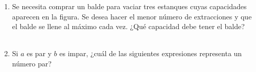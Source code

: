 \documentclass[11pt,letterpaper]{article}
\newcommand{\figureplaceholder}[2][4.2cm]{%
\begin{center}
\fbox{%
\begin{minipage}[c][#1][c]{0.88\linewidth}
\centering \textbf{Espacio reservado para figura}\\[3pt]
#2
\end{minipage}}
\end{center}}
\newenvironment{alternativas}{%
\begin{enumerate}[label=\Alph*), leftmargin=14pt, itemsep=2pt, topsep=2pt]
}{\end{enumerate}}
\begin{document}
\begin{enumerate}[label=\textbf{\arabic*.}, leftmargin=*, itemsep=7pt]
\item
\begin{minipage}[t]{\linewidth}
Se necesita comprar un balde para vaciar tres estanques cuyas capacidades aparecen en la figura. Se desea hacer el menor número de extracciones y que el balde se llene al máximo cada vez. ¿Qué capacidad debe tener el balde?\\
\\%
\begin{minipage}{\linewidth}
\vspace{7mm}
\end{minipage}
\vspace{7mm}
\end{minipage}

\item
\begin{minipage}[t]{\linewidth}
Si $a$ es par y $b$ es impar, ¿cuál de las siguientes expresiones representa un número par?\\
\\%
\begin{minipage}{\linewidth}
\vspace{7mm}
\end{minipage}
\vspace{7mm}
\end{minipage}


\end{enumerate}
\end{document}
